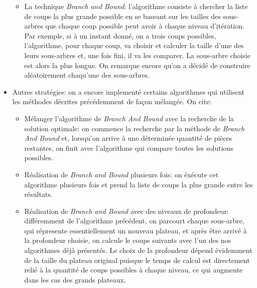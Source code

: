 \documentclass{article}
\begin{document}
\begin{itemize}
\begin {itemize}
	\vspace{12pt}
	
    \item La technique \textit{Branch and Bound}: l'algorithme consiste à
    chercher la liste de coups la plus grande possible en se baseant sur
    les tailles des sous-arbres que chaque coup possible peut avoir à chaque
    niveau d'itération. Par exemple, si à un instant donné, on a trois coups
    possibles, l'algorithme, pour chaque coup, va choisir et calculer la taille
    d'une des leurs sous-arbres et, une fois fini, il va les comparer. La
    sous-arbre choisie est alors la plus longue. On remarque encore qu'on a
    décidé de construire aléatoirement chaqu'une des sous-arbres.  
    
  \end{itemize}  
  
  \vspace{12pt}
  
  \item Autres stratégies: on a encore implementé certains algorithmes qui
  utilisent les méthodes décrites précédemment de façon mélangée. On cite:
  
  \vspace{12pt}
  
  \begin {itemize}
    
    \item Mélanger l'algorithme de \textit{Branch And Bound} avec la recherche
    de la solution optimale: on commence la recherche par la méthode de
    \textit{Branch And Bound} et, lorsqu'on arrive à une déterminée quantité
    de pièces restantes, on finit avec l'algorithme qui compare toutes les
    solutions possibles.
    
	\vspace{12pt}
	
    \item Réalisation de \textit{Branch and Bound} plusieurs fois: on éxécute
    cet algorithme plusieurs fois et prend la liste de coups la plus grande
    entre les résultats.
    
    \vspace{12pt}
    
    \item Réalisation de \textit{Branch and Bound} avec des niveaux de
    profondeur: différemment de l'algorithme précédent, on parcourt chaque
    sous-arbre, qui répresente essentiellement un nouveau plateau, et après   
    être arrivé à la profondeur choisie, on calcule le coups suivants avec l'un
    des nos algorithmes déjà présentés. Le choix de la profondeur dépend
    évidemment de la taille du plateau original puisque le temps de calcul est
    directement relié à la quantité de coups possibles à chaque niveau, ce qui
    augmente dans les cas des grands plateaux.
        
  \end{itemize}

\end{itemize}
\end{document}
